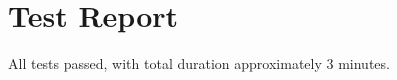 \documentclass{article}
\begin{document}
%
%
%
%
%
%
%
%
%
%
%
%
%
%
%
%
%
%
%
%
%
%
%
%
%
%
%
%
%
%
%
%
%
%
%
%
%

\section{Test Report}

All tests passed, with total duration approximately 3 minutes.
\end{document}
